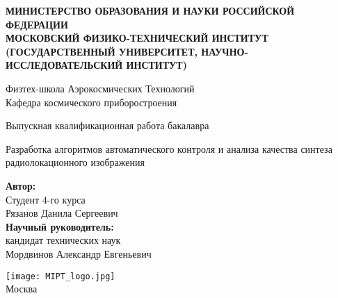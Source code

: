 \begin{center}
    \large\textbf{МИНИСТЕРСТВО ОБРАЗОВАНИЯ И НАУКИ РОССИЙСКОЙ ФЕДЕРАЦИИ \\
    МОСКОВСКИЙ ФИЗИКО-ТЕХНИЧЕСКИЙ ИНСТИТУТ \\
    (ГОСУДАРСТВЕННЫЙ УНИВЕРСИТЕТ, НАУЧНО-ИССЛЕДОВАТЕЛЬСКИЙ ИНСТИТУТ)} \\
    \vspace{1cm}

    Физтех-школа Аэрокосмических Технологий \\

    Кафедра космического приборостроения \\

    \vspace{3em}

    Выпускная квалификационная работа бакалавра
\end{center}

\begin{center}
    \vspace{\fill}
    \LARGE{Разработка алгоритмов автоматического контроля и анализа качества синтеза радиолокационного изображения}

    \vspace{\fill}
\end{center}


\begin{flushright}
    \vspace{4em}
    \textbf{Автор:} \\
    Студент 4-го курса \\
    Рязанов Данила Сергеевич \\
    \vspace{2em}
    \textbf{Научный руководитель:} \\
    кандидат технических наук \\
    Мордвинов Александр Евгеньевич \\

\end{flushright}

\vspace{7em}

\begin{center}
    \texttt{[image: MIPT\_logo.jpg]}\\
    Москва \the\year{}
\end{center}

\thispagestyle{empty}

\setcounter{page}{2}
\fancyfoot[c]{\thepage}

